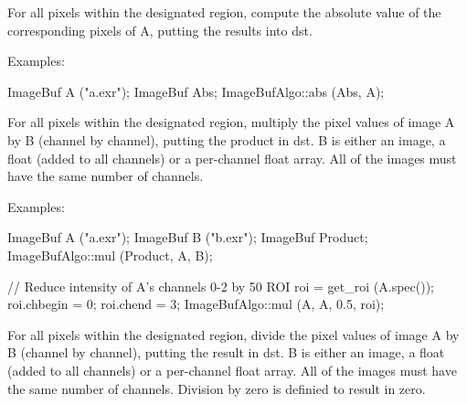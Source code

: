  

For all pixels within the designated region, compute the absolute value of
the corresponding pixels of {\cf A}, putting the results into {\cf dst}.

\smallskip
\noindent Examples:
\begin{code}
    ImageBuf A ("a.exr");
    ImageBuf Abs;
    ImageBufAlgo::abs (Abs, A);
\end{code}
\apiend



 

For all pixels within the designated region, multiply the pixel values
of image {\cf A} by {\cf B} (channel by channel), putting the product in
{\cf dst}.  {\cf B} is either an image,
a float (added to all channels) or a per-channel float array.
All of the images must have the same number of channels.

\smallskip
\noindent Examples:
\begin{code}
    ImageBuf A ("a.exr");
    ImageBuf B ("b.exr");
    ImageBuf Product;
    ImageBufAlgo::mul (Product, A, B);

    // Reduce intensity of A's channels 0-2 by 50%
    ROI roi = get_roi (A.spec());
    roi.chbegin = 0;  roi.chend = 3;
    ImageBufAlgo::mul (A, A, 0.5, roi);
\end{code}
\apiend


 
For all pixels within the designated region, divide the pixel values
of image {\cf A} by {\cf B} (channel by channel), putting the result in
{\cf dst}.  {\cf B} is either an image,
a float (added to all channels) or a per-channel float array.
All of the images must have the same number of channels.
Division by zero is definied to result in zero.

